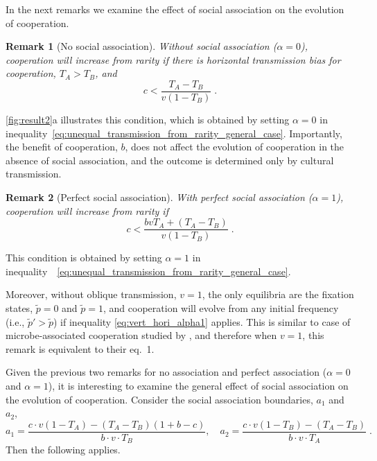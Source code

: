 \documentclass[12pt]{extarticle}
\newtheorem{remark}{Remark}
\begin{document}
In the next remarks we examine the effect of social association on the evolution of cooperation.
\\

\begin{remark}[No social association]
\label{remark:alpha0}
Without social association ($\alpha=0$), cooperation will increase from rarity if there is horizontal transmission bias for cooperation, $T_A>T_B$, and
\begin{equation}
\label{eq:vert_hori_alpha0}
c < \frac{T_A - T_B}{v(1-T_B)} \;.
\end{equation}
\end{remark}

\autoref{fig:result2}a illustrates this condition, which is obtained by setting $\alpha=0$ in inequality~\ref{eq:unequal_transmission_from_rarity_general_case}.
Importantly, the benefit of cooperation, $b$, does not affect the evolution of cooperation in the absence of social association, and the outcome is determined only by  cultural transmission.
\\

\begin{remark}[Perfect social association]
\label{remark:alpha1}
With perfect social association ($\alpha=1$), cooperation will increase from rarity if
\begin{equation}\label{eq:vert_hori_alpha1}
c < \frac{b v T_A + (T_A - T_B)}{v(1-T_B)} \;.
\end{equation}
\end{remark}
This condition is obtained by setting $\alpha=1$ in inequality~\ \ref{eq:unequal_transmission_from_rarity_general_case}.

Moreover, without oblique transmission, $v=1$, the only equilibria are the fixation states, $\tilde{p}=0$ and $\tilde{p}=1$, and cooperation will evolve from any initial frequency (i.e., $\tilde{p}'>\tilde{p}$) if inequality \ref{eq:vert_hori_alpha1} applies.
This is similar to case of microbe-associated cooperation studied by \citet{lewin2017microbes}, and therefore when $v=1$, this remark is equivalent to their eq.~1.

Given the previous two remarks for no association and perfect association ($\alpha=0$ and $\alpha=1$), it is interesting to examine the general effect of social association on the evolution of cooperation.
Consider the social association boundaries, $a_1$ and $a_2$,
\begin{equation} \label{eq:boundries_assortative_meeting_general_case}
  a_1 = \frac{c\cdot v(1-T_A) -(T_A-T_B)(1+b-c)}{b\cdot v \cdot T_B}, \quad
  a_2 = \frac{c\cdot v(1-T_B)-(T_A-T_B)}{b\cdot v\cdot T_A} \;.
\end{equation}
Then the following applies.
\\
\end{document}

